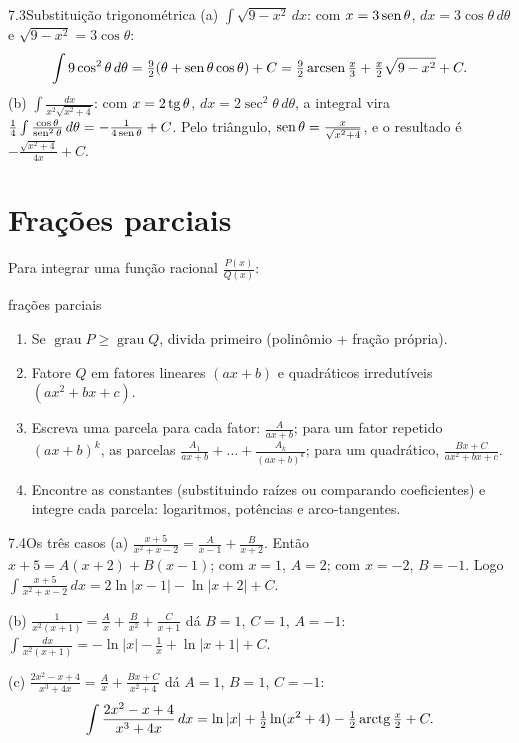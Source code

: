 \begin{exemplo}{7.3}{Substituição trigonométrica}
(a) $\int\sqrt{9-x^2}\,dx$: com $x=3\operatorname{sen}\theta$, $dx=3\cos\theta\,d\theta$ e
$\sqrt{9-x^2}=3\cos\theta$:
\[
\int9\cos^2\theta\,d\theta=\tfrac92(\theta+\operatorname{sen}\theta\cos\theta)+C
=\tfrac92\operatorname{arcsen}\tfrac x3+\tfrac x2\sqrt{9-x^2}+C .
\]
(b) $\int\frac{dx}{x^2\sqrt{x^2+4}}$: com $x=2\operatorname{tg}\theta$, $dx=2\sec^2\theta\,d\theta$, a
integral vira $\frac14\int\frac{\cos\theta}{\operatorname{sen}^2\theta}\,d\theta=-\frac1{4\operatorname{sen}\theta}+C$.
Pelo triângulo, $\operatorname{sen}\theta=\frac x{\sqrt{x^2+4}}$, e o resultado é
$-\frac{\sqrt{x^2+4}}{4x}+C$.
\end{exemplo}

\section{Frações parciais}

Para integrar uma função racional $\frac{P(x)}{Q(x)}$:
\begin{estrategia}{frações parciais}
\begin{enumerate}[label=\arabic*.]
\item Se $\operatorname{grau}P\ge\operatorname{grau}Q$, divida primeiro (polinômio + fração
  própria).
\item Fatore $Q$ em fatores lineares $(ax+b)$ e quadráticos irredutíveis $(ax^2+bx+c)$.
\item Escreva uma parcela para cada fator: $\frac A{ax+b}$; para um fator repetido $(ax+b)^k$,
  as parcelas $\frac{A_1}{ax+b}+\dots+\frac{A_k}{(ax+b)^k}$; para um quadrático,
  $\frac{Bx+C}{ax^2+bx+c}$.
\item Encontre as constantes (substituindo raízes ou comparando coeficientes) e integre cada
  parcela: logaritmos, potências e arco-tangentes.
\end{enumerate}
\end{estrategia}

\begin{exemplo}{7.4}{Os três casos}
(a) $\frac{x+5}{x^2+x-2}=\frac A{x-1}+\frac B{x+2}$. Então $x+5=A(x+2)+B(x-1)$; com $x=1$,
$A=2$; com $x=-2$, $B=-1$. Logo
$\int\frac{x+5}{x^2+x-2}\,dx=2\ln|x-1|-\ln|x+2|+C$.

(b) $\frac1{x^2(x+1)}=\frac Ax+\frac B{x^2}+\frac C{x+1}$ dá $B=1$, $C=1$, $A=-1$:
$\int\frac{dx}{x^2(x+1)}=-\ln|x|-\frac1x+\ln|x+1|+C$.

(c) $\frac{2x^2-x+4}{x^3+4x}=\frac Ax+\frac{Bx+C}{x^2+4}$ dá $A=1$, $B=1$, $C=-1$:
\[
\int\frac{2x^2-x+4}{x^3+4x}\,dx=\ln|x|+\tfrac12\ln(x^2+4)-\tfrac12\operatorname{arctg}\tfrac x2+C .
\]
\end{exemplo}

